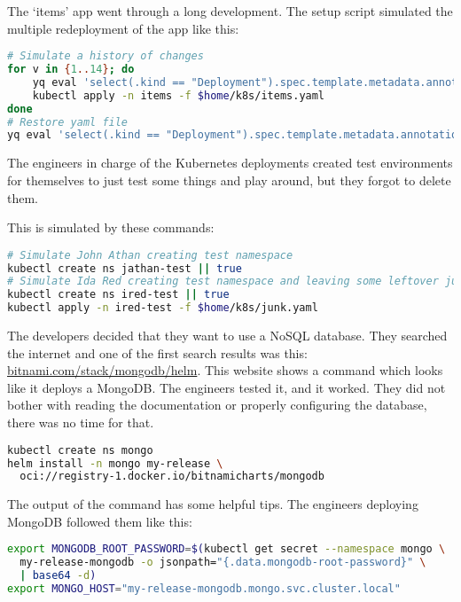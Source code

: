 The `items' app went through a long development. The setup script simulated the multiple redeployment of the app like this:

\begin{lstlisting}[caption={Create first deployment},language=bash,label=code:bash4]
# Simulate a history of changes
for v in {1..14}; do
    yq eval 'select(.kind == "Deployment").spec.template.metadata.annotations.v = env(v)' $home/k8s/items.yaml -i
    kubectl apply -n items -f $home/k8s/items.yaml
done
# Restore yaml file
yq eval 'select(.kind == "Deployment").spec.template.metadata.annotations.v = "0"' $home/k8s/items.yaml -i
\end{lstlisting}

The engineers in charge of the Kubernetes deployments created test environments for themselves to just test some things and play around, but they forgot to delete them.

This is simulated by these commands:

\begin{lstlisting}[caption={Create first deployment},language=bash,label=code:bash5]
# Simulate John Athan creating test namespace
kubectl create ns jathan-test || true
# Simulate Ida Red creating test namespace and leaving some leftover junk in it
kubectl create ns ired-test || true
kubectl apply -n ired-test -f $home/k8s/junk.yaml
\end{lstlisting}

The developers decided that they want to use a NoSQL database. They searched the internet and one of the first search results was this: \url{bitnami.com/stack/mongodb/helm}. This website shows a command which looks like it deploys a MongoDB. The engineers tested it, and it worked. They did not bother with reading the documentation or properly configuring the database, there was no time for that.

\begin{lstlisting}[caption={Create first deployment},language=bash,label=code:bash5]
kubectl create ns mongo
helm install -n mongo my-release \
  oci://registry-1.docker.io/bitnamicharts/mongodb
\end{lstlisting}

The output of the command has some helpful tips. The engineers deploying MongoDB followed them like this:

\begin{lstlisting}[caption={Create first deployment},language=bash,label=code:bash6]
export MONGODB_ROOT_PASSWORD=$(kubectl get secret --namespace mongo \
  my-release-mongodb -o jsonpath="{.data.mongodb-root-password}" \
  | base64 -d)
export MONGO_HOST="my-release-mongodb.mongo.svc.cluster.local"
\end{lstlisting}

